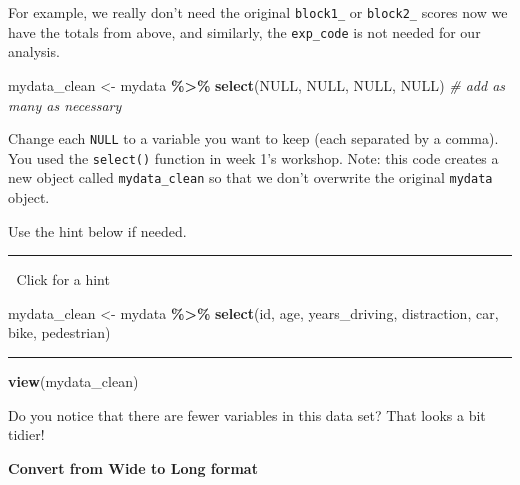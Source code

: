 \documentclass[
]{book}
\newenvironment{Shaded}{\begin{snugshade}}{\end{snugshade}}
\newcommand{\CommentTok}[1]{\textcolor[rgb]{0.56,0.35,0.01}{\textit{#1}}}
\newcommand{\ConstantTok}[1]{\textcolor[rgb]{0.56,0.35,0.01}{#1}}
\newcommand{\FunctionTok}[1]{\textcolor[rgb]{0.13,0.29,0.53}{\textbf{#1}}}
\newcommand{\NormalTok}[1]{#1}
\newcommand{\OtherTok}[1]{\textcolor[rgb]{0.56,0.35,0.01}{#1}}
\newcommand{\SpecialCharTok}[1]{\textcolor[rgb]{0.81,0.36,0.00}{\textbf{#1}}}
\begin{document}
For example, we really don't need the original \texttt{block1\_} or \texttt{block2\_} scores now we have the totals from above, and similarly, the \texttt{exp\_code} is not needed for our analysis.

\begin{Shaded}
\begin{Highlighting}[]
\NormalTok{mydata\_clean }\OtherTok{\textless{}{-}}\NormalTok{ mydata }\SpecialCharTok{\%\textgreater{}\%}
  \FunctionTok{select}\NormalTok{(}\ConstantTok{NULL}\NormalTok{, }\ConstantTok{NULL}\NormalTok{, }\ConstantTok{NULL}\NormalTok{, }\ConstantTok{NULL}\NormalTok{) }\CommentTok{\# add as many as necessary}
\end{Highlighting}
\end{Shaded}

Change each \texttt{NULL} to a variable you want to keep (each separated by a comma). You used the \texttt{select()} function in week 1's workshop. Note: this code creates a new object called \texttt{mydata\_clean} so that we don't overwrite the original \texttt{mydata} object.

Use the hint below if needed.

\begin{center}\rule{0.5\linewidth}{0.5pt}\end{center}

👀 Click for a hint

\begin{Shaded}
\begin{Highlighting}[]
\NormalTok{mydata\_clean }\OtherTok{\textless{}{-}}\NormalTok{ mydata }\SpecialCharTok{\%\textgreater{}\%}
  \FunctionTok{select}\NormalTok{(id, age, years\_driving, distraction, car, bike, pedestrian)}
\end{Highlighting}
\end{Shaded}

\begin{center}\rule{0.5\linewidth}{0.5pt}\end{center}

\begin{Shaded}
\begin{Highlighting}[]
\FunctionTok{view}\NormalTok{(mydata\_clean)}
\end{Highlighting}
\end{Shaded}

Do you notice that there are fewer variables in this data set? That looks a bit tidier!

\textbf{Convert from Wide to Long format}
\end{document}
